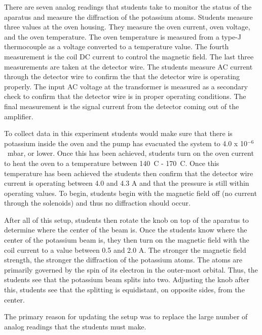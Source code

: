There are seven analog readings that students take to monitor the status of the aparatus and measure the diffraction of the potassium atoms.
Students measure three values at the oven housing.
They measure the oven current, oven voltage, and the oven temperature.
The oven temperature is measured from a type-J thermocouple as a voltage converted to a temperature value.
The fourth measurement is the coil DC current to control the magnetic field.
The last three measurements are taken at the detector wire.
The students measure AC current through the detector wire to confirm the that the detector wire is operating properly.
The input AC voltage at the transformer is measured as a secondary check to confirm that the detector wire is in proper operating conditions.
The final measurement is the signal current from the detector coming out of the amplifier.

To collect data in this experiment students would make sure that there is potassium inside the oven and the pump has evacuated the system to 4.0 x 10$^{-6}$~mbar, or lower.
Once this has been achieved, students turn on the oven current to heat the oven to a temperature between 140\textdegree~C - 170\textdegree~C.
Once this temperature has been achieved the students then confirm that the detector wire current is operating between 4.0 and 4.3 A and that the pressure is still within operating values.
To begin, students begin with the magnetic field off (no current through the solenoids) and thus no diffraction should occur.

After all of this setup, students then rotate the knob on top of the aparatus to determine where the center of the beam is.
Once the students know where the center of the potassium beam is, they then turn on the magnetic field with the coil current to a value between 0.5 and 2.0 A.
The stronger the magnetic field strength, the stronger the diffraction of the potassium atoms.
The atoms are primarily governed by the spin of its electron in the outer-most orbital.
Thus, the students see that the potassium beam splits into two.
Adjusting the knob after this, students see that the splitting is equidistant, on opposite sides, from the center.

The primary reason for updating the setup was to replace the large number of analog readings that the students must make.


